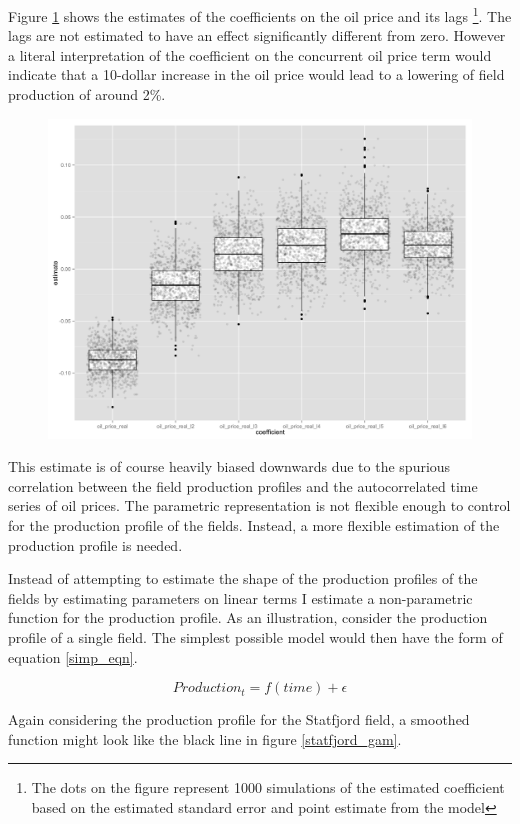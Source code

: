 \documentclass[12pt]{scrartcl} %
\begin{document}
Figure \ref{glm_dirty_box} shows the estimates of the coefficients on the oil price and its lags \footnote{The dots on the figure represent 1000 simulations of the estimated coefficient based on the estimated standard error and point estimate from the model}.  The lags are not estimated to have an effect significantly different from zero. However a literal interpretation of the coefficient on the concurrent oil price term would indicate that a 10-dollar increase in the oil price would lead to a lowering of field production of around 2\%.

\begin{figure}
\includegraphics[width=.8\textwidth]{glm_dirty_box.png}
\caption{}
\label{glm_dirty_box}
\end{figure}

This estimate is of course heavily biased downwards due to the spurious correlation between the field production profiles and the autocorrelated time series of oil prices.  The parametric representation is not flexible enough to control for the production profile of the fields.  Instead, a more flexible estimation of the production profile is needed. 

Instead of attempting to estimate the shape of the production profiles of the fields by estimating parameters on linear terms I estimate a non-parametric function for the production profile.  As an illustration, consider the production profile of a single field.  The simplest possible model would then have the form of equation \ref{simp_eqn}. 

\begin{equation}
Production_{t}=f(time) + \epsilon
	\label{simp_eqn}
\end{equation}

Again considering the production profile for the Statfjord field, a smoothed function might look like the black line in figure \ref{statfjord_gam}.   
\end{document}
